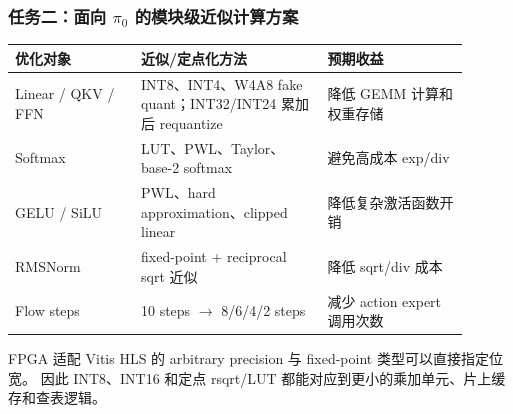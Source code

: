 \documentclass[10pt, aspectratio=169]{beamer}
\begin{document}
\begin{frame}
  \frametitle{任务二：面向 $\pi_0$ 的模块级近似计算方案}
  \small
  \begin{table}
    \begin{tabular}{@{}p{0.25\linewidth}p{0.37\linewidth}p{0.28\linewidth}@{}}
      \toprule
      优化对象               & 近似/定点化方法                                             & 预期收益                  \\
      \midrule
      Linear / QKV / FFN & INT8、INT4、W4A8 fake quant；INT32/INT24 累加后 requantize & 降低 GEMM 计算和权重存储       \\
      Softmax            & LUT、PWL、Taylor、base-2 softmax                        & 避免高成本 exp/div         \\
      GELU / SiLU        & PWL、hard approximation、clipped linear                & 降低复杂激活函数开销            \\
      RMSNorm            & fixed-point + reciprocal sqrt 近似                     & 降低 sqrt/div 成本        \\
      Flow steps         & 10 steps $\rightarrow$ 8/6/4/2 steps                 & 减少 action expert 调用次数 \\
      \bottomrule
    \end{tabular}
  \end{table}

  \vspace{4pt}
  \begin{exampleblock}{FPGA 适配}
    Vitis HLS 的 arbitrary precision 与 fixed-point 类型可以直接指定位宽。
    因此 INT8、INT16 和定点 rsqrt/LUT 都能对应到更小的乘加单元、片上缓存和查表逻辑。
  \end{exampleblock}
\end{frame}
\end{document}
